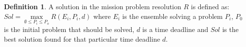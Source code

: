 \documentclass[journal]{IEEEtran}
\theoremstyle{definition}
\newtheorem{definition}{Definition}
\newcommand\patrizio[1]{\nb{Patrizio}{#1}}
\begin{document}
\begin{definition}
A solution in the mission problem resolution $R$ is defined as:
$Sol=\max \limits_{ \emptyset \leq P_i \leq P_o} R(E_i, P_i, d)$
where $E_i$ is the ensemble solving a problem $P_i$, $P_0$ is the initial problem that should be solved, $d$ is a time deadline and $Sol$ is the best solution found for that particular time deadline $d$.





\end{definition}









\end{document}
